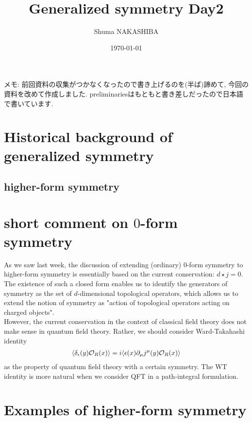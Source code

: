 \documentclass{ltjsarticle}
\title{Generalized symmetry Day2}
\author{Shuma NAKASHIBA}
\date{\today}
\theoremstyle{mystyle} %
\numberwithin{equation}{section}
\begin{document}
\maketitle

\setcounter{tocdepth}{2}
\tableofcontents
\newpage
\noindent
\small

メモ: 前回資料の収集がつかなくなったので書き上げるのを(半ば)諦めて, 今回の資料を改めて作成しました. 
preliminariesはもともと書き差しだったので日本語で書いています. 
\normalsize
\section{Historical background of generalized symmetry}
\subsection{higher-form symmetry}
\section{short comment on $0$-form symmetry}
As we saw last week, the discussion of extending (ordinary) $0$-form symmetry to higher-form symmetry is 
essentially based on the current conservation: $d\star j=0$. 
The existence of such a closed form enables us to identify the generators of symmetry as the set of $d$-dimensional topological operators, 
which allows us to extend the notion of symmetry as "action of topological operators acting on charged objects". \\
 However, the current conservation in the context of classical field theory does not make sense in quantum field theory. 
 Rather, we should consider Ward-Takahashi identity
 \begin{align}
    \langle{\delta_\epsilon(y)\mathcal{O}_R(x)}\rangle=i\langle{\epsilon(x)\partial_\mu j^\mu(y)\mathcal{O}_R(x)}\rangle
 \end{align}
as the property of quantum field theory with a certain symmetry. 
The WT identity is more natural when we consider QFT in a path-integral formulation. 
\section{Examples of higher-form symmetry}
\end{document}
